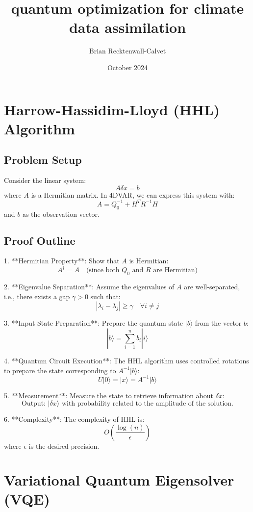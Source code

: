 \documentclass{article}
\title{quantum optimization for climate data assimilation}
\author{Brian Recktenwall-Calvet}
\date{October 2024}
\begin{document}
\maketitle

\section{Harrow-Hassidim-Lloyd (HHL) Algorithm}

\subsection{Problem Setup}

Consider the linear system:
\[
A \delta x = b
\]
where \( A \) is a Hermitian matrix. In 4DVAR, we can express this system with:
\[
A = Q_0^{-1} + H^T R^{-1} H
\]
and \( b \) as the observation vector.

\subsection{Proof Outline}

1. **Hermitian Property**: Show that \( A \) is Hermitian:
   \[
   A^\dagger = A \quad \text{(since both } Q_0 \text{ and } R \text{ are Hermitian)}
   \]

2. **Eigenvalue Separation**: Assume the eigenvalues of \( A \) are well-separated, i.e., there exists a gap \( \gamma > 0 \) such that:
   \[
   |\lambda_i - \lambda_j| \geq \gamma \quad \forall i \neq j
   \]

3. **Input State Preparation**: Prepare the quantum state \( |b\rangle \) from the vector \( b \):
   \[
   |b\rangle = \sum_{i=1}^n b_i |i\rangle
   \]

4. **Quantum Circuit Execution**: The HHL algorithm uses controlled rotations to prepare the state corresponding to \( A^{-1}|b\rangle \):
   \[
   U |0\rangle = |x\rangle = A^{-1}|b\rangle
   \]

5. **Measurement**: Measure the state to retrieve information about \( \delta x \):
   \[
   \text{Output: } |\delta x\rangle \text{ with probability related to the amplitude of the solution.}
   \]

6. **Complexity**: The complexity of HHL is:
   \[
   O\left(\frac{\log(n)}{\epsilon}\right)
   \]
   where \( \epsilon \) is the desired precision.


\section{Variational Quantum Eigensolver (VQE)}
\end{document}
